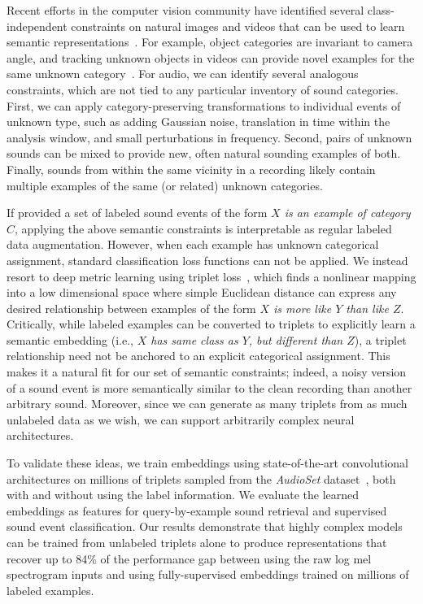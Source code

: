 \documentclass{article}
\begin{document}
Recent efforts in the computer vision community have identified several
class-independent constraints on natural images and videos that can be used to
learn semantic representations~\cite{zhang2016colorful}.  For example, object
categories are invariant to camera angle, and tracking unknown objects in videos
can provide novel examples for the same unknown
category~\cite{wang2015unsupervised}.  For audio, we can identify several
analogous constraints, which are not tied to any particular inventory of sound
categories.  First, we can apply category-preserving transformations to
individual events of unknown type, such as adding Gaussian noise, translation in
time within the analysis window, and small perturbations in frequency.  Second,
pairs of unknown sounds can be mixed to provide new, often natural sounding
examples of both.  Finally, sounds from within the same vicinity in a recording
likely contain multiple examples of the same (or related) unknown categories.

If provided a set of labeled sound events of the form \emph{$X$ is an example of
  category $C$}, applying the above semantic constraints is interpretable as
regular labeled data augmentation.  However, when each example has unknown
categorical assignment, standard classification loss functions can not be
applied.  We instead resort to deep metric learning using triplet
loss~\cite{weinberger2009distance,wang2014learning,hoffer2015deep}, which finds
a nonlinear mapping into a low dimensional space where simple Euclidean distance
can express any desired relationship between examples of the form \emph{$X$ is
  more like $Y$ than like $Z$}.  Critically, while labeled examples can be
converted to triplets to explicitly learn a semantic embedding (i.e., \emph{$X$
  has same class as $Y$, but different than $Z$}), a triplet relationship need
not be anchored to an explicit categorical assignment.  This makes it a natural
fit for our set of semantic constraints; indeed, a noisy version of a sound
event is more semantically similar to the clean recording than another arbitrary
sound.  Moreover, since we can generate as many triplets from as much unlabeled
data as we wish, we can support arbitrarily complex neural architectures.

To validate these ideas, we train embeddings using state-of-the-art
convolutional architectures on millions of triplets sampled from the
\emph{AudioSet} dataset~\cite{audioset}, both with and without using the label
information.  We evaluate the learned embeddings as features for
query-by-example sound retrieval and supervised sound event classification.  Our
results demonstrate that highly complex models can be trained from unlabeled
triplets alone to produce representations that recover up to 84\% of the
performance gap between using the raw log mel spectrogram inputs and using
fully-supervised embeddings trained on millions of labeled examples.
\end{document}

